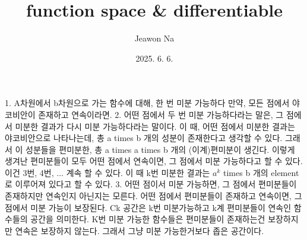 \documentclass[11pt,reqno]{amsart}
\renewcommand{\(}{\left(}
\renewcommand{\)}{\right)}
\renewcommand{\[}{\left[}
\renewcommand{\]}{\right]}
\begin{document}
\title[]{function space \& differentiable}
\author{Jeawon Na}
\date{2025. 6. 6.}

\maketitle

\section{}

\subsection{}

1. A차원에서 b차원으로 가는 함수에 대해, 한 번 미분 가능하다 만약, 모든 점에서 야코비안이 존재하고 연속이라면.
2. 어떤 점에서 두 번 미분 가능하다라는 말은, 그 점에서 미분한 결과가 다시 미분 가능하다라는 말이다. 이 때, 
어떤 점에서 미분한 결과는 야코비안으로 나타나는데, 총 a times b 개의 성분이 존재한다고 생각할 수 있다. 
그래서 이 성분들을 편미분한, 총 a times a times b 개의 (이계)편미분이 생긴다. 이렇게 생겨난 편미분들이 모두 어떤 
점에서 연속이면, 그 점에서 미분 가능하다고 할 수 있다. 이건 3번, 4번, ... 계속 할 수 있다. 이 때 k번 미분한 결과는 
$a^k$ times b 개의 element로 이루어져 있다고 할 수 있다.
3. 어떤 점이서 미분 가능하면, 그 점에서 편미분들이 존재하지만 연속인지 아닌지는 모른다. 어떤 점에서 편미분들이 
존재하고 연속이면, 그 점에서 미분 가능이 보장된다. Ck 공간은 k번 미분가능하고 k계 편미분들이 연속인 함수들의 
공간을 의미한다. K번 미분 가능한 함수들은 편미분들이 존재하는건 보장하지만 연속은 보장하지 않는다. 그래서 그냥 
미분 가능한거보다 좁은 공간이다.
\end{document}
